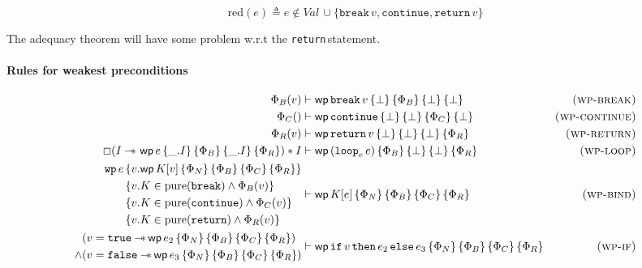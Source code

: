 \documentclass{article}
\numberwithin{algorithm}{section}
\newcommand{\progspec}[1]{\{ #1 \}}
\newcommand{\true}{\texttt{true}}
\newcommand{\false}{\texttt{false}}
\newcommand{\cloop}[1]{\texttt{loop}_{#1}\,}
\newcommand{\cbreak}{\texttt{break}\,}
\newcommand{\ccontinue}{\texttt{continue}}
\newcommand{\cif}{\texttt{if}\,}
\newcommand{\cthen}{\,\texttt{then}\,}
\newcommand{\celse}{\,\texttt{else}\,}
\newcommand{\creturn}{\texttt{return}\,}
\newcommand{\pure}[1]{\text{pure}(#1)}
\newcommand{\cred}{\text{red}}
\newcommand{\wand}{-\mkern-8mu*\,}
\newcommand{\wpre}[5]{\textsf{wp}\, #1\, \progspec{#2}\, \progspec{#3}\, \progspec{#4}\, \progspec{#5}}
\begin{document}
$$
\cred(e) \triangleq e \notin \textit{Val}\, \cup \{\cbreak v, \ccontinue, \creturn v\}
$$

The adequacy theorem will have some problem w.r.t the \creturn statement.

\paragraph{Rules for weakest preconditions}

$$
\begin{aligned}
    \Phi_B(v) &\vdash \wpre{\cbreak v}{\bot}{\Phi_B}{\bot}{\bot} & \textsc{(wp-break)} \\
    \Phi_C() &\vdash \wpre{\ccontinue}{\bot}{\bot}{\Phi_C}{\bot} & \textsc{(wp-continue)} \\
    \Phi_R(v) &\vdash \wpre{\creturn v}{\bot}{\bot}{\bot}{\Phi_R} & \textsc{(wp-return)} \\
    \Box(I \wand{}\, \wpre{e}{\_. I}{\Phi_B}{\_. I}{\Phi_R}) * I &\vdash \wpre{(\cloop{e}e)}{\Phi_B}{\bot}{\bot}{\Phi_R} & \textsc{(wp-loop)} \\
    \begin{aligned}
        \texttt{wp}\,e\,& \progspec{v. \wpre{K[v]}{\Phi_N}{\Phi_B}{\Phi_C}{\Phi_R}} \\
                        & \progspec{v. K \in \pure{\cbreak\!} \land \Phi_B(v)} \\
                        & \progspec{v. K \in \pure{\ccontinue} \land \Phi_C(v)} \\
                        & \progspec{v. K \in \pure{\creturn\!} \land \Phi_R(v)}
    \end{aligned} &\vdash \wpre{K[e]}{\Phi_N}{\Phi_B}{\Phi_C}{\Phi_R} & \textsc{(wp-bind)} \\
    \begin{aligned}
        &(v = \true \wand \wpre{e_2}{\Phi_N}{\Phi_B}{\Phi_C}{\Phi_R}) \\
        \land &(v = \false \wand \wpre{e_3}{\Phi_N}{\Phi_B}{\Phi_C}{\Phi_R})
    \end{aligned} &\vdash \wpre{\cif v \cthen e_2 \celse e_3}{\Phi_N}{\Phi_B}{\Phi_C}{\Phi_R} & \textsc{(wp-if)}
\end{aligned}
$$
\end{document}
